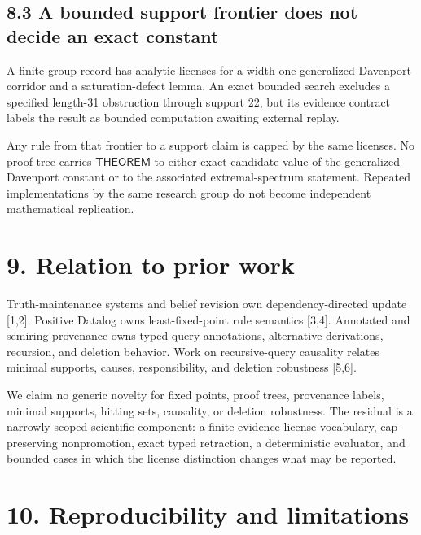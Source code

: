 \documentclass[
  11pt,
]{article}
\begin{document}
\hypertarget{a-bounded-support-frontier-does-not-decide-an-exact-constant}{%
\subsection{8.3 A bounded support frontier does not decide an exact
constant}\label{a-bounded-support-frontier-does-not-decide-an-exact-constant}}

A finite-group record has analytic licenses for a width-one
generalized-Davenport corridor and a saturation-defect lemma. An exact
bounded search excludes a specified length-31 obstruction through
support 22, but its evidence contract labels the result as bounded
computation awaiting external replay.

Any rule from that frontier to a support claim is capped by the same
licenses. No proof tree carries \(\textsf{THEOREM}\) to either exact
candidate value of the generalized Davenport constant or to the
associated extremal-spectrum statement. Repeated implementations by the
same research group do not become independent mathematical replication.

\hypertarget{relation-to-prior-work}{%
\section{9. Relation to prior work}\label{relation-to-prior-work}}

Truth-maintenance systems and belief revision own dependency-directed
update {[}1,2{]}. Positive Datalog owns least-fixed-point rule semantics
{[}3,4{]}. Annotated and semiring provenance owns typed query
annotations, alternative derivations, recursion, and deletion behavior.
Work on recursive-query causality relates minimal supports, causes,
responsibility, and deletion robustness {[}5,6{]}.

We claim no generic novelty for fixed points, proof trees, provenance
labels, minimal supports, hitting sets, causality, or deletion
robustness. The residual is a narrowly scoped scientific component: a
finite evidence-license vocabulary, cap-preserving nonpromotion, exact
typed retraction, a deterministic evaluator, and bounded cases in which
the license distinction changes what may be reported.

\hypertarget{reproducibility-and-limitations}{%
\section{10. Reproducibility and
limitations}\label{reproducibility-and-limitations}}
\end{document}
